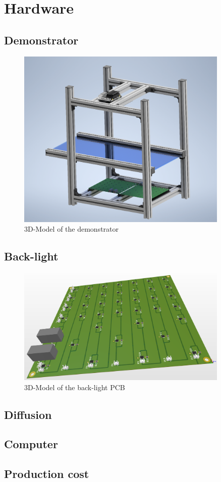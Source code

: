 \section{Hardware}

\subsection{Demonstrator}

\begin{figure}[ht]
	\centering
	\includegraphics[width=0.9\textwidth]{3-development/images/Demonstrator.png}
	\caption{3D-Model of the demonstrator\label{development:demo}}
\end{figure} 
\newpage

\subsection{Back-light}
\begin{figure}[ht]
	\centering
	\includegraphics[width=0.9\textwidth]{3-development/images/Backlight.png}
	\caption{3D-Model of the back-light PCB\label{development:pcb}}
\end{figure} 

\subsection{Diffusion}
\subsection{Computer}

\subsection{Production cost}
